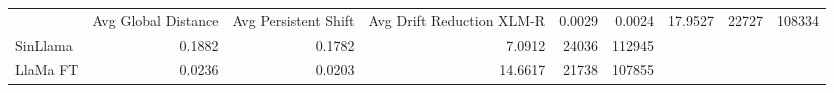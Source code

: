 \begin{tabular}{lrrrrr}
\toprule
 & Avg Global Distance & Avg Persistent Shift & Avg Drift Reduction %
\midrule
XLM-R & 0.0029 & 0.0024 & 17.9527 & 22727 & 108334 \\
SinLlama & 0.1882 & 0.1782 & 7.0912 & 24036 & 112945 \\
LlaMa FT & 0.0236 & 0.0203 & 14.6617 & 21738 & 107855 \\
\bottomrule
\end{tabular}
